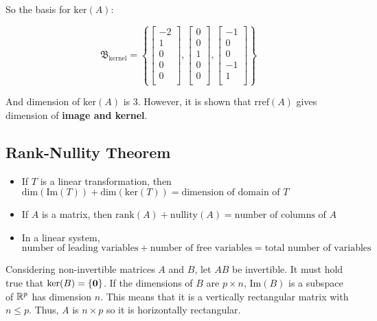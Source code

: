 So the basis for $\mathrm{ker}(A)$:

\[\mathfrak{B}_\mathrm{kernel}=\left\{\begin{bmatrix}-2\\1\\0\\0\\0\\ \end{bmatrix}, \begin{bmatrix} 0\\0\\1\\0\\0\\ \end{bmatrix}, \begin{bmatrix}-1\\0\\0\\-1\\1\\ \end{bmatrix} \right\}\]

And dimension of $\mathrm{ker}(A)$ is 3.
However, it is shown that $\mathrm{rref}(A)$ gives dimension of \textbf{image and kernel}.

\subsection{Rank-Nullity Theorem}

\begin{framed}
    \begin{itemize}
        \item If $T$ is a linear transformation, 
        then \\$\mathrm{dim}(\mathrm{Im}(T))+\mathrm{dim}(\mathrm{ker}(T))=\text{dimension of domain of }T$
        \item If $A$ is a matrix, then $\mathrm{rank}(A)+\mathrm{nullity}(A)=\text{number of columns of }A$
        \item In a linear system, 
        \\$\text{number of leading variables}+\text{number of free variables}=\text{total number of variables}$
    \end{itemize}
\end{framed}

Considering non-invertible matrices $A$ and $B$, let $AB$ be invertible.
It must hold true that $\mathrm{ker}(B)=\{\textbf{0}\}$. If the dimensions of $B$ are $p\times n$,
$\mathrm{Im}(B)$ is a subspace of $\mathbb{R}^p$ has dimension $n$. This means that it is a vertically rectangular
matrix with $n\leq p$. Thus, $A$ is $n\times p$ so it is horizontally rectangular.